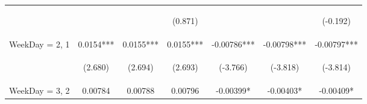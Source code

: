 \documentclass[]{article}
\begin{document}
\begin{center}
\begin{tabular}{lcccccc}
        \vspace{4pt}     & \begin{footnotesize}\end{footnotesize}         & \begin{footnotesize}\end{footnotesize}         & \begin{footnotesize}(0.871)\end{footnotesize}  & \begin{footnotesize}\end{footnotesize}         & \begin{footnotesize}\end{footnotesize}         & \begin{footnotesize}(-0.192)\end{footnotesize} \\
        WeekDay = 2, 1   & 0.0154***                                      & 0.0155***                                      & 0.0155***                                      & -0.00786***                                    & -0.00798***                                    & -0.00797***                                    \\
        \vspace{4pt}     & \begin{footnotesize}(2.680)\end{footnotesize}  & \begin{footnotesize}(2.694)\end{footnotesize}  & \begin{footnotesize}(2.693)\end{footnotesize}  & \begin{footnotesize}(-3.766)\end{footnotesize} & \begin{footnotesize}(-3.818)\end{footnotesize} & \begin{footnotesize}(-3.814)\end{footnotesize} \\
        WeekDay = 3, 2   & 0.00784                                        & 0.00788                                        & 0.00796                                        & -0.00399*                                      & -0.00403*                                      & -0.00409*                                      \\

\end{tabular}
\end{center}
\end{document}
